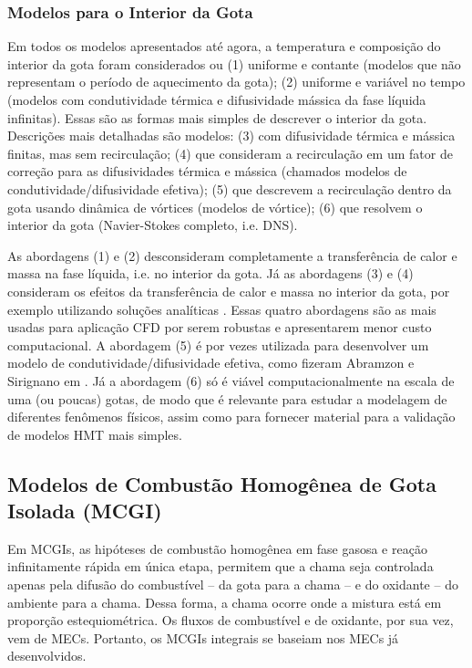 \subsubsection{Modelos para o Interior da Gota} \label{sec:int}

Em todos os modelos apresentados até agora, a temperatura e composição do interior da gota foram considerados ou (1) uniforme e contante (modelos que não representam o período de aquecimento da gota); (2) uniforme e variável no tempo (modelos com condutividade térmica e difusividade mássica da fase líquida infinitas).
Essas são as formas mais simples de descrever o interior da gota.
Descrições mais detalhadas são modelos: (3) com difusividade térmica e mássica finitas, mas sem recirculação; (4) que consideram a recirculação em um fator de correção para as difusividades térmica e mássica (chamados modelos de condutividade/difusividade efetiva); (5) que descrevem a recirculação dentro da gota usando dinâmica de vórtices (modelos de vórtice); (6) que resolvem o interior da gota (Navier-Stokes completo, i.e. DNS). \cite{Sazhin2006}

As abordagens (1) e (2) desconsideram completamente a transferência de calor e massa na fase líquida, i.e. no interior da gota.
Já as abordagens (3) e (4) consideram os efeitos da transferência de calor e massa no interior da gota, por exemplo utilizando soluções analíticas \cite{ZanuttoC2019}.
Essas quatro abordagens são as mais usadas para aplicação CFD por serem robustas e apresentarem menor custo computacional. 
A abordagem (5) é por vezes utilizada para desenvolver um modelo de condutividade/difusividade efetiva, como fizeram Abramzon e Sirignano em \cite{Sirignano1989}.
Já a abordagem (6) só é viável computacionalmente na escala de uma (ou poucas) gotas, de modo que é relevante para estudar a modelagem de diferentes fenômenos físicos, assim como para fornecer material para a validação de modelos HMT mais simples.



\subsection{Modelos de Combustão Homogênea de Gota Isolada (MCGI)} \label{sec:MCGI}

Em MCGIs, as hipóteses de combustão homogênea em fase gasosa e reação infinitamente rápida em única etapa, permitem que a chama seja controlada apenas pela difusão do combustível -- da gota para a chama -- e do oxidante -- do ambiente para a chama.
Dessa forma, a chama ocorre onde a mistura está em proporção estequiométrica.
Os fluxos de combustível e de oxidante, por sua vez, vem de MECs.
Portanto, os MCGIs integrais se baseiam nos MECs já desenvolvidos.


